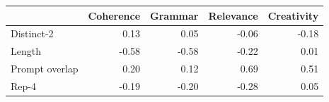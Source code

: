 \begin{tabular}{lrrrr}
\toprule
 & Coherence & Grammar & Relevance & Creativity \\
\midrule
Distinct-2 & 0.13 & 0.05 & -0.06 & -0.18 \\
Length & -0.58 & -0.58 & -0.22 & 0.01 \\
Prompt overlap & 0.20 & 0.12 & 0.69 & 0.51 \\
Rep-4 & -0.19 & -0.20 & -0.28 & 0.05 \\
\bottomrule
\end{tabular}
